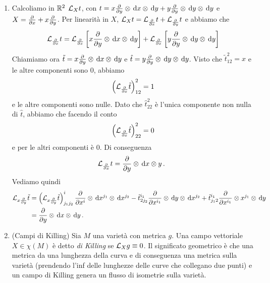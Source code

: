 \begin{example}
	\begin{enumerate}
		\item Calcoliamo in $\mathbb R^2$ $\mathcal L_Xt$, con $t=x\frac{\partial }{\partial y}\otimes \,\mathrm d x \otimes \,\mathrm d y + y\frac{\partial }{\partial y} \otimes \,\mathrm d y \otimes \,\mathrm d y$ e $X = \frac{\partial }{\partial x} + x \frac{\partial }{\partial y}$.
		Per linearità in $X$, $\mathcal L_Xt = \mathcal L_{\frac{\partial }{\partial x}}t + \mathcal L_{\frac{\partial }{\partial y}}t$ e abbiamo che
		\begin{equation*}
			\mathcal L_{\frac{\partial }{\partial x}} t = \mathcal L_{\frac{\partial }{\partial x}} \left[x \frac{\partial }{\partial y}\otimes \,\mathrm d x \otimes \,\mathrm d y\right] + \mathcal L_{\frac{\partial }{\partial x}} \left[y \frac{\partial }{\partial y}\otimes \,\mathrm d y \otimes \,\mathrm d y\right]
		\end{equation*}
		Chiamiamo ora $\tilde t = x\frac{\partial }{\partial y}\otimes \,\mathrm d x \otimes \,\mathrm d y$ e $\hat t = y\frac{\partial }{\partial y} \otimes \,\mathrm d y \otimes \,\mathrm d y$. Visto che $\tilde t_{12}^2 = x$ e le altre componenti sono 0, abbiamo
		\begin{equation*}
			\left(\mathcal L_{\frac{\partial }{\partial x}}\tilde t\right)_{12}^2 = 1
		\end{equation*}
		e le altre componenti sono nulle. 
		Dato che $\hat t_{22}^2$ è l'unica componente non nulla di $\hat t$, abbiamo che facendo il conto
		\begin{equation*}
			\left(\mathcal L_{\frac{\partial }{\partial x}}\hat t\right)_{22}^2 = 0
		\end{equation*}
		e per le altri componenti è 0. Di conseguenza
		\begin{equation*}
			\mathcal L_{\frac{\partial }{\partial x}} t = \frac{\partial }{\partial y} \otimes \,\mathrm d x \otimes y \, \text{. }
		\end{equation*}
		Vediamo quindi
		\begin{align*}
			\mathcal L_{x\frac{\partial }{\partial y}} \tilde t &= \left(\mathcal L_{x\frac{\partial }{\partial y}} \tilde t\right)_{j_1j_2}^i \frac{\partial }{\partial x^i}\otimes\,\mathrm d x^{j_1}\otimes \,\mathrm d x^{j_2} - \tilde t_{2j_2}^{i_1}\frac{\partial }{\partial x^{i_1}} \otimes \,\mathrm d y\otimes \,\mathrm d x^{j_2}
			+ \tilde t_{j_12}^{i_1} \frac{\partial }{\partial x^{i_1}} \otimes x^{j_1}\otimes \,\mathrm d y\\
			&= \frac{\partial }{\partial y}\otimes \,\mathrm d x \otimes \,\mathrm d y \, \text{. }
		\end{align*}

		
		\item (Campi di Killing) Sia $M$ una varietà con metrica $g$. Una campo vettoriale $X\in\chi(M)$ è detto \emph{di Killing} se $\mathcal L_Xg \equiv 0$. Il significato geometrico è che una metrica da una lunghezza della curva e di conseguenza una metrica sulla varietà (prendendo l'inf delle lunghezze delle curve che collegano due punti) e un campo di Killing genera un flusso di isometrie sulla varietà.
		

\end{enumerate}
\end{example}

